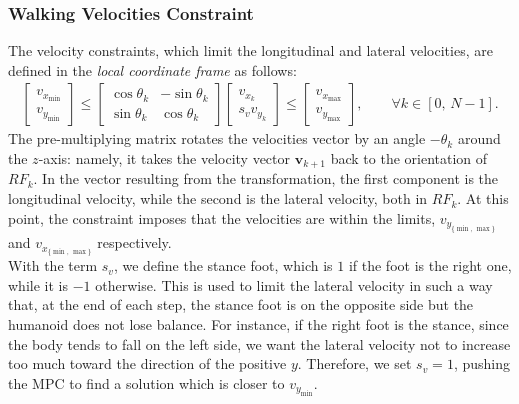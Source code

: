 \subsubsection{Walking Velocities Constraint}
The velocity constraints, which limit the longitudinal and lateral velocities, are defined in the \textit{local coordinate frame} as follows:
\begin{align}
    \begin{bmatrix}
        v_{x_{\min}} \\[1ex]
        v_{y_{\min}}
    \end{bmatrix}
    \le
    \begin{bmatrix}
        \cos\theta_{k} & -\sin\theta_{k} \\[1ex]
        \sin\theta_{k} & \cos\theta_{k}
    \end{bmatrix}
    \begin{bmatrix}
        v_{x_{k}} \\[1ex]
        s_{v} v_{y_{k}}
    \end{bmatrix}
    \le
    \begin{bmatrix}
        v_{x_{\max}} \\[1ex]
        v_{y_{\max}}
    \end{bmatrix}
    , \qquad \forall k \in \left[ 0,\, N-1\right].
\end{align}
The pre-multiplying matrix rotates the velocities vector by an angle $-\theta_k$ around the $z$-axis: namely, it takes the velocity vector $\mathbf{v}_{k+1}$ back to the orientation of $RF_{k}$. In the vector resulting from the transformation, the first component is the longitudinal velocity, while the second is the lateral velocity, both in $RF_k$. At this point, the constraint imposes that the velocities are within the limits, $v_{y_{\{\min,\, \max\}}}$ and $v_{x_{\{\min,\, \max\}}}$ respectively.\\
With the term $s_v$, we define the stance foot, which is $1$ if the foot is the right one, while it is $-1$ otherwise. This is used to limit the lateral velocity in such a way that, at the end of each step, the stance foot is on the opposite side but the humanoid does not lose balance.
For instance, if the right foot is the stance, since the body tends to fall on the left side, we want the lateral velocity not to increase too much toward the direction of the positive $y$. Therefore, we set $s_v=1$, pushing the MPC to find a solution which is closer to $v_{y_{\min}}$.

